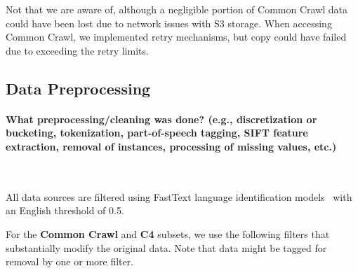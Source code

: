 Not that we are aware of, although a negligible portion of Common Crawl data could have been lost due to network issues with S3 storage. 
When accessing Common Crawl, we implemented retry mechanisms, but copy could have failed due to exceeding the retry limits. 

\subsection{Data Preprocessing}
\label{datasheet:processing}


\paragraph{What preprocessing/cleaning was done? (e.g., discretization or bucketing, tokenization, part-of-speech tagging, SIFT feature extraction, removal of instances, processing of missing values, etc.)}~



All data sources are filtered using FastText language identification models~\citep{joulin2016fasttext,joulin2016bag} with an English threshold of 0.5.

For the \textbf{Common Crawl} and \textbf{C4} subsets, we use the following filters that substantially modify the original data. 
Note that data might be tagged for removal by one or more filter.


